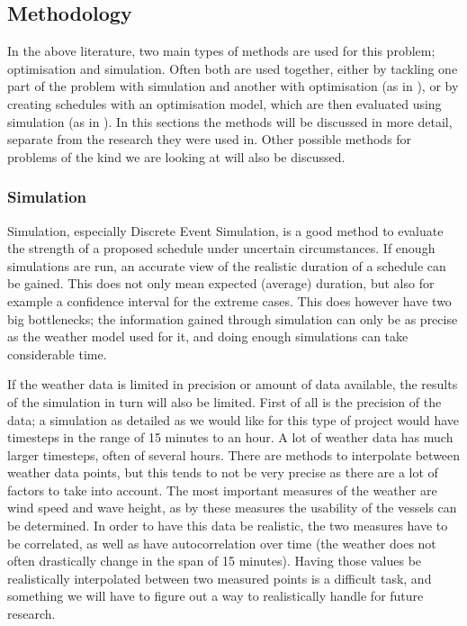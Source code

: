 \documentclass[a4paper,12pt]{article}
\begin{document}
\subsection{Methodology} \label{ss:meth}
In the above literature, two main types of methods are used for this problem; optimisation and simulation. Often both are used together, either by tackling one part of the problem with simulation and another with optimisation (as in \cite{barlow2018mixed}), or by creating schedules with an optimisation model, which are then evaluated using simulation (as in \cite{kerkhove2017optimised}). In this sections the methods will be discussed in more detail, separate from the research they were used in. Other possible methods for problems of the kind we are looking at will also be discussed. 

\bigskip

\subsubsection{Simulation} \label{sss:sim}
Simulation, especially Discrete Event Simulation, is a good method to evaluate the strength of a proposed schedule under uncertain circumstances. If enough simulations are run, an accurate view of the realistic duration of a schedule can be gained. This does not only mean expected (average) duration, but also for example a confidence interval for the extreme cases. This does however have two big bottlenecks; the information gained through simulation can only be as precise as the weather model used for it, and doing enough simulations can take considerable time. 

\bigskip

If the weather data is limited in precision or amount of data available, the results of the simulation in turn will also be limited. First of all is the precision of the data; a simulation as detailed as we would like for this type of project would have timesteps in the range of 15 minutes to an hour. A lot of weather data has much larger timesteps, often of several hours. There are methods to interpolate between weather data points, but this tends to not be very precise as there are a lot of factors to take into account. The most important measures of the weather are wind speed and wave height, as by these measures the usability of the vessels can be determined. In order to have this data be realistic, the two measures have to be correlated, as well as have autocorrelation over time (the weather does not often drastically change in the span of 15 minutes). Having those values be realistically interpolated between two measured points is a difficult task, and something we will have to figure out a way to realistically handle for future research.
\end{document}
